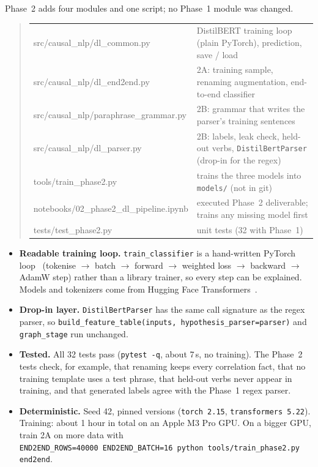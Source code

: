 \documentclass[12pt,a4paper]{article}
\newenvironment{examplebox}{\begin{quote}}{\end{quote}}
\newcommand{\code}[1]{\texttt{#1}}
\begin{document}
Phase~2 adds four modules and one script; no Phase~1 module was changed.

\begin{examplebox}
\footnotesize
\begin{tabularx}{\linewidth}{@{}>{\ttfamily}l@{\hspace{1.2em}}>{\raggedright\arraybackslash}X@{}}
src/causal\_nlp/dl\_common.py         & DistilBERT training loop (plain PyTorch), prediction, save / load \\
src/causal\_nlp/dl\_end2end.py        & 2A: training sample, renaming augmentation, end-to-end classifier \\
src/causal\_nlp/paraphrase\_grammar.py & 2B: grammar that writes the parser's training sentences \\
src/causal\_nlp/dl\_parser.py         & 2B: labels, leak check, held-out verbs, \texttt{DistilBertParser} (drop-in for the regex) \\
tools/train\_phase2.py               & trains the three models into \texttt{models/} (not in git) \\
notebooks/02\_phase2\_dl\_pipeline.ipynb & executed Phase~2 deliverable; trains any missing model first \\
tests/test\_phase2.py                & 18 unit tests (32 with Phase~1) \\
\end{tabularx}
\end{examplebox}

\begin{itemize}
  \item \textbf{Readable training loop.} \code{train\_classifier} is a hand-written PyTorch loop~\cite{paszke2019} (tokenise $\rightarrow$
        batch $\rightarrow$ forward $\rightarrow$ weighted loss $\rightarrow$ backward $\rightarrow$ AdamW step) rather than a library trainer, so
        every step can be explained. Models and tokenizers come from Hugging Face Transformers~\cite{wolf2020}.
  \item \textbf{Drop-in layer.} \code{DistilBertParser} has the same call signature as the regex parser, so
        \code{build\_feature\_table(inputs, hypothesis\_parser=parser)} and \code{graph\_stage} run unchanged.
  \item \textbf{Tested.} All 32 tests pass (\code{pytest -q}, about 7\,s, no training). The Phase~2 tests check, for example, that renaming
        keeps every correlation fact, that no training template uses a test phrase, that held-out verbs never appear in training, and
        that generated labels agree with the Phase~1 regex parser.
  \item \textbf{Deterministic.} Seed 42, pinned versions (\code{torch 2.15}, \code{transformers 5.22}). Training: about 1 hour in total on an
        Apple M3 Pro GPU. On a bigger GPU, train 2A on more data with\\
        \code{END2END\_ROWS=40000 END2END\_BATCH=16 python tools/train\_phase2.py end2end}.
\end{itemize}
\end{document}
